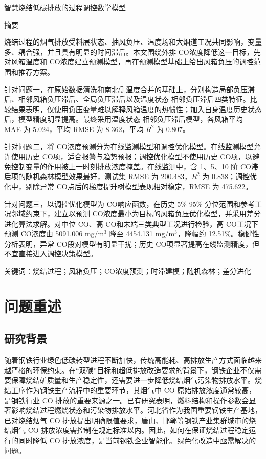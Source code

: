 \documentclass[UTF8,a4paper,zihao=-4]{ctexart}
\newcommand{\papertitle}{智慧烧结低碳排放的过程调控数学模型}
\newcommand{\CO}{CO}
\begin{document}
\setcounter{page}{1}
\begin{center}
\vspace{1.0em}
{\heiti \papertitle}

\vspace{2.0em}
{\heiti 摘\quad 要}
\end{center}

烧结过程的烟气排放受料层状态、抽风负压、温度场和大烟道工况共同影响，变量多、耦合强，并且具有明显的时间滞后。本文围绕外排 \CO 浓度降低这一目标，先对风箱温度和 \CO 浓度建立预测模型，再在预测模型基础上给出风箱负压的调控范围和推荐方案。

针对问题一，在原始数据清洗和南北侧温度合并的基础上，分别构造局部负压滞后、相邻风箱负压滞后、全局负压滞后以及温度状态-相邻负压滞后四类特征。比较结果表明，仅使用负压变量难以解释风箱温度的热惯性；加入自身温度历史状态后，模型精度明显提高。最终采用温度状态-相邻负压滞后模型，各风箱平均 MAE 为 5.024，平均 RMSE 为 8.362，平均 $R^2$ 为 0.807。

针对问题二，将 \CO 浓度预测分为在线监测模型和调控优化模型。在线监测模型允许使用历史 \CO 项，适合报警与趋势预报；调控优化模型不使用历史 \CO 项，以避免控制变量的作用被上一时刻排放浓度掩盖。在线监测中，含 1、5、10 阶 \CO 滞后项的随机森林模型效果最好，测试集 RMSE 为 200.483，$R^2$ 为 0.838；调控优化中，剔除异常 \CO 点后的梯度提升树模型表现相对稳定，RMSE 为 475.622。

针对问题三，以调控优化模型为 \CO 响应函数，在历史 5\%-95\% 分位范围和参考工况邻域约束下，建立以预测 \CO 浓度最小为目标的风箱负压优化模型，并采用差分进化算法求解。对中位 \CO、高 \CO 和末端三类典型工况进行检验，高 \CO 工况下预测 \CO 浓度由 5091.006 mg/m$^3$ 降至 4454.131 mg/m$^3$，降幅约 12.51\%。稳健性分析表明，异常 \CO 段对模型有明显干扰；历史 \CO 项显著提高在线监测精度，但不宜直接进入调控决策模型。

\vspace{1em}
\noindent\heiti 关键词：\songti 烧结过程；风箱负压；\CO 浓度预测；时滞建模；随机森林；差分进化

\newpage

\section{问题重述}

\subsection{研究背景}

随着钢铁行业绿色低碳转型进程不断加快，传统高能耗、高排放生产方式面临越来越严格的环保约束。在“双碳”目标和超低排放改造要求的背景下，钢铁企业不仅需要保障烧结矿质量和生产稳定性，还需要进一步降低烧结烟气污染物排放水平。烧结工序作为钢铁生产流程中的重要环节，其烟气中 CO 原始排放浓度通常较高，是钢铁行业 CO 排放的重要来源之一。已有研究表明，燃料结构和操作参数会显著影响烧结过程燃烧状态和污染物排放水平\cite{ni2019fuel,wang2022coemission,zhou2020biomass}。河北省作为我国重要钢铁生产基地，已对烧结烟气 CO 排放提出明确限值要求，唐山、邯郸等钢铁产业集群城市的烧结烟气 CO 排放浓度需控制在规定标准以内。因此，如何在保证烧结过程稳定运行的同时降低 CO 排放浓度，是当前钢铁企业智能化、绿色化改造中亟需解决的问题。
\end{document}
